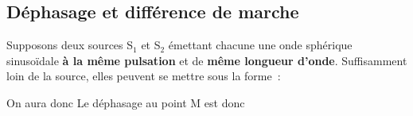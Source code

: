 \documentclass[../../main/main.tex]{subfiles}
\begin{document}
\subsection{Déphasage et différence de marche}
\noindent
\begin{minipage}{0.65\linewidth}
	Supposons deux sources S$_1$ et S$_2$ émettant chacune une onde sphérique
	sinusoïdale \textbf{à la même pulsation} et de \textbf{même longueur d'onde}.
	Suffisamment loin de la source, elles peuvent se mettre sous la forme~:
\end{minipage}
\hfill
\begin{minipage}{0.30\linewidth}
	\begin{center}
		\vspace{-15pt}
	\end{center}
\end{minipage}
\psw{
	\[
		s_1(\Mr,t) = A_1\cos(\wt - k\SaMr + \f_{01})
		\qet
		s_2(\Mr,t) = A_2\cos(\wt - k\SbMr + \f_{02})
	\]
}
On aura donc
\psw{
	\[
		\f_1(\Mr) = -k\SaMr + \f_{01}
		\qet
		\f_2(\Mr) = -k\SaMr + \f_{02}
	\]
}
Le déphasage au point M est donc
\psw{
	\[\D\f_{1/2}(\Mr) = \f_1(\Mr) - \f_2(\Mr) = -k(\SaMr - \SbMr) + \f_{01} -
		\f_{02}\]
}
\end{document}
